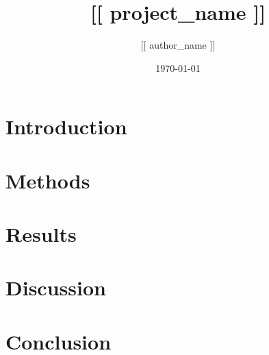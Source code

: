 \documentclass{[[ latex_class ]]}
\title{[[ project_name ]]}
\author{[[ author_name ]]}
\date{\today}
\begin{document}
\maketitle

\begin{abstract}
\end{abstract}

\section{Introduction}


\section{Methods}


\section{Results}


\section{Discussion}


\section{Conclusion}


\printbibliography
\end{document}
